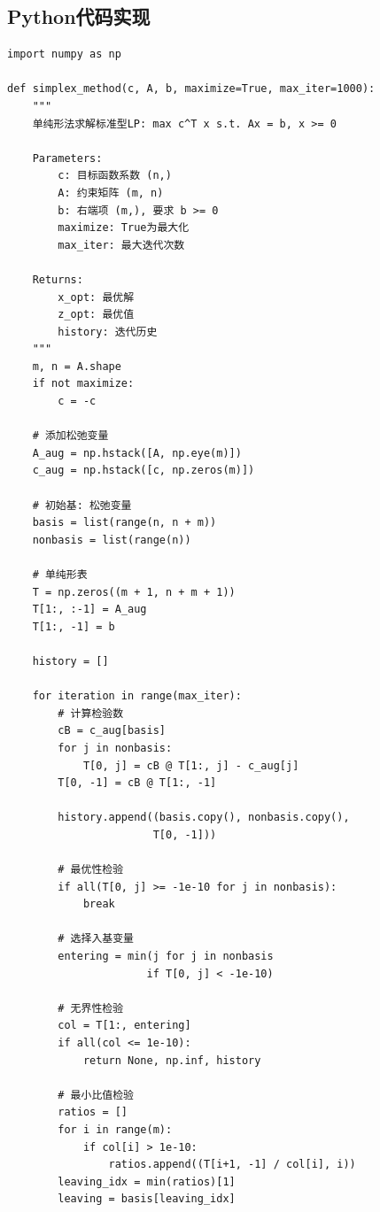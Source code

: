 \subsection{Python代码实现}\label{sec:simplex-code}

\begin{codebox}[单纯形法完整实现]
\begin{lstlisting}
import numpy as np

def simplex_method(c, A, b, maximize=True, max_iter=1000):
    """
    单纯形法求解标准型LP: max c^T x s.t. Ax = b, x >= 0
    
    Parameters:
        c: 目标函数系数 (n,)
        A: 约束矩阵 (m, n)
        b: 右端项 (m,), 要求 b >= 0
        maximize: True为最大化
        max_iter: 最大迭代次数
    
    Returns:
        x_opt: 最优解
        z_opt: 最优值
        history: 迭代历史
    """
    m, n = A.shape
    if not maximize:
        c = -c
    
    # 添加松弛变量
    A_aug = np.hstack([A, np.eye(m)])
    c_aug = np.hstack([c, np.zeros(m)])
    
    # 初始基: 松弛变量
    basis = list(range(n, n + m))
    nonbasis = list(range(n))
    
    # 单纯形表
    T = np.zeros((m + 1, n + m + 1))
    T[1:, :-1] = A_aug
    T[1:, -1] = b
    
    history = []
    
    for iteration in range(max_iter):
        # 计算检验数
        cB = c_aug[basis]
        for j in nonbasis:
            T[0, j] = cB @ T[1:, j] - c_aug[j]
        T[0, -1] = cB @ T[1:, -1]
        
        history.append((basis.copy(), nonbasis.copy(),
                       T[0, -1]))
        
        # 最优性检验
        if all(T[0, j] >= -1e-10 for j in nonbasis):
            break
        
        # 选择入基变量
        entering = min(j for j in nonbasis
                      if T[0, j] < -1e-10)
        
        # 无界性检验
        col = T[1:, entering]
        if all(col <= 1e-10):
            return None, np.inf, history
        
        # 最小比值检验
        ratios = []
        for i in range(m):
            if col[i] > 1e-10:
                ratios.append((T[i+1, -1] / col[i], i))
        leaving_idx = min(ratios)[1]
        leaving = basis[leaving_idx]
        

\end{lstlisting}
\end{codebox}
